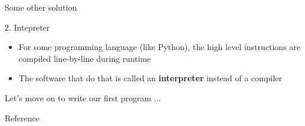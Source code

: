 \documentclass[10pt,xcolor={table,dvipsnames},t]{beamer}
\begin{document}
\begin{frame}{Some other solution}
  \begin{block}{2. Intepreter}
    \begin{itemize}
      \item For some programming language (like Python), the high level instructions are compiled line-by-line during runtime
      \item The software that do that is called an \textbf{interpreter} instead of a compiler
    \end{itemize}
  \end{block}
\end{frame}

\begin{frame}{Let's move on to write our first program ... }
  
\end{frame}
\begin{frame}[allowframebreaks]{Reference}
  \printbibliography
\end{frame}
\end{document}
